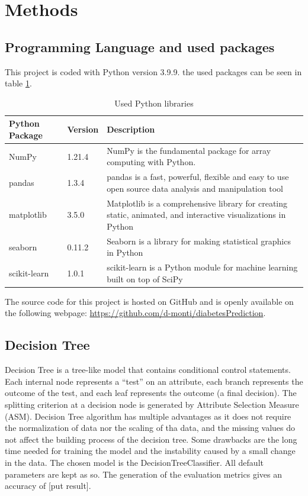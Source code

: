 \documentclass[11pt]{article}
\renewcommand{\arraystretch}{1.3}
\begin{document}
	\section{Methods}
	\subsection{Programming Language and used packages}
		This project is coded with Python version 3.9.9. the used packages can be seen in table \ref{tab:Python}.
	\begin{table}[H]
		\renewcommand{\arraystretch}{1.3}
		
		\centering
		\begin{tabularx}{\linewidth}{llX}
			Python Package & Version & Description \\
			\toprule
			NumPy \cite{numpy} & 1.21.4 & NumPy is the fundamental package for array computing with Python.\\
			pandas \cite{pandas} & 1.3.4 & pandas is a fast, powerful, flexible and easy to use open source data analysis and manipulation tool\\
			matplotlib \cite{matplotlib} & 3.5.0 & Matplotlib is a comprehensive library for creating static, animated, and interactive visualizations in Python\\
			seaborn \cite{seaborn} &  0.11.2 & Seaborn is a library for making statistical graphics in Python \\
			scikit-learn \cite{scikit} & 1.0.1  & scikit-learn is a Python module for machine learning built on top of SciPy \\

		\end{tabularx}
		\caption{Used Python libraries}
		\label{tab:Python}
	\end{table}
	The source code for this project is hosted on GitHub and is openly available on the following webpage: \url{https://github.com/d-monti/diabetesPrediction}.

	
	\subsection{Decision Tree}
	Decision Tree is a tree-like model that contains conditional control statements. Each internal node represents a “test” on an attribute, each branch represents the outcome of the test, and each leaf represents the outcome (a final decision). The splitting criterion at a decision node is generated by Attribute Selection Measure (ASM).
	\medbreak
	Decision Tree algorithm has multiple advantages as it does not require the normalization of data nor the scaling of tha data, and the missing values do not affect the building process of the decision tree. Some drawbacks are the long time needed for training the model and the instability caused by a small change in the data.
	\medbreak
	The chosen model is the DecisionTreeClassifier. All default parameters are kept as so.
	The generation of the evaluation metrics gives an accuracy of [put result].
	
\end{document}
